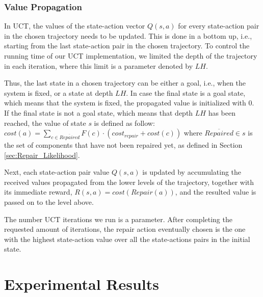 \documentclass[a4paper,11pt]{report}
\begin{document}
\subsection{Value Propagation}

In UCT, the values of the state-action vector $Q(s,a)$ for every state-action pair in the chosen trajectory needs to be updated. This is done in a bottom up, i.e., starting from the last state-action pair in the chosen trajectory. To control the running time of our UCT implementation, we limited the depth of the trajectory in each iteration, where this limit is a parameter denoted by $LH$. 


Thus, the last state in a chosen trajectory 
can be either a goal, i.e., when the system is fixed, or 
a state at depth $LH$. In case the final state is a goal state, which means that the system is fixed, the propagated value is initialized with 0. If the final state is not a goal state, which means that  depth $LH$ has been reached, the value of state $s$ is defined as follow: 
$cost(a)=\sum_{c\in \overline{Repaired}} F(c)\cdot(cost_{repair}+cost(c))$
where $\overline{Repaired} \in s$ is the set of components that have not been repaired yet, as defined in Section \ref{sec:Repair_Likelihood}. 

Next, each state-action pair value $Q(s,a)$ is updated by accumulating the received values propagated from the lower levels of the trajectory, together with its immediate reward, $R(s,a) = cost(Repair(a))$, and the resulted value is passed on to the level above. 

The number UCT iterations we run is a parameter. After completing the requested amount of iterations, the repair action eventually chosen is the one with the highest state-action value over all the state-actions pairs in the initial state.

\chapter{Experimental Results}
\end{document}
